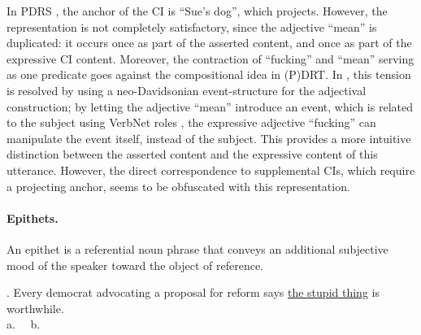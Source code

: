 \noindent In PDRS \Last[a], the anchor of the CI is ``Sue's dog'', which
projects.  However, the representation is not completely satisfactory, since
the adjective ``mean'' is duplicated: it occurs once as part of the asserted
content, and once as part of the expressive CI content. Moreover, the
contraction of ``fucking'' and ``mean'' serving as one predicate goes
against the compositional idea in (P)DRT. In \Last[b], this tension is
resolved by using a neo-Davidsonian event-structure for the adjectival
construction; by letting the adjective ``mean'' introduce an event, which is
related to the subject using VerbNet roles \citep{kipper2008large}, the
expressive adjective ``fucking'' can manipulate the event itself, instead of
the subject. This provides a more intuitive distinction between the asserted
content and the expressive content of this utterance. However, the direct
correspondence to supplemental CIs, which require a projecting anchor, seems
to be obfuscated with this representation.

\paragraph{Epithets.} An epithet is a referential noun phrase that conveys
an additional subjective mood of the speaker toward the object of reference.

\noindent\parbox[b]{\textwidth}{
\ex. Every democrat advocating a proposal for reform says 
  \underline{the stupid thing} is worthwhile.\\
a.~~
b.~~

}

